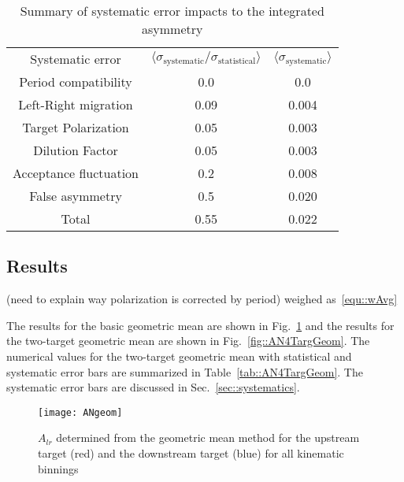 \begin{table}[h!t]
  \centering
  \begin{tabular}{|c|c|c|}
    \hline
    \multirow{2}{*}{Systematic error}&
    \multirow{2}{*}{
      $\langle \sigma_{\mathrm{systematic}}/\sigma_{\mathrm{statistical}}
      \rangle$} &
    \multirow{2}{*}{$\langle \sigma_{\mathrm{systematic}} \rangle$}\\
    & & \\ \hline \hline

    Period compatibility& 0.0 & 0.0\\ \hline

    Left-Right migration& 0.09 & 0.004\\ \hline

    Target Polarization& 0.05& 0.003\\ \hline

    Dilution Factor& 0.05 & 0.003\\ \hline

    Acceptance fluctuation& 0.2 & 0.008\\ \hline

    False asymmetry& 0.5 & 0.020\\ \hline

    Total& 0.55 & 0.022\\\hline
    
  \end{tabular}
  \caption{Summary of systematic error impacts to the integrated asymmetry}
  \label{tab::sysError}
\end{table}

\subsection{Results} \label{sec::lr_results}
(need to explain way polarization is corrected by period)
weighed as~\ref{equ::wAvg}

\noindent
The results for the basic geometric mean are shown in Fig.~\ref{fig::ANgeom} and
the results for the two-target geometric mean are shown in
Fig.~\ref{fig::AN4TargGeom}.  The numerical values for the two-target geometric
mean with statistical and systematic error bars are summarized in
Table~\ref{tab::AN4TargGeom}.  The systematic error bars are discussed in
Sec.~\ref{sec::systematics}.

\begin{figure}[h!t]
  \begin{center}
    \texttt{[image: ANgeom]} 
    \caption{$A_{lr}$ determined from the geometric mean method for the
      upstream target (red) and the downstream target (blue) for all kinematic
      binnings}
    \label{fig::ANgeom}
  \end{center}
\end{figure}

